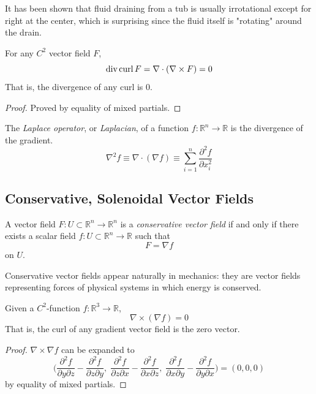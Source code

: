   It has been shown that fluid draining from a tub is usually irrotational except for right at the center, which is surprising since the fluid itself is "rotating" around the drain. 

  \begin{theorem}
  For any $C^2$ vector field $F$, 
  \[\operatorname{div}{\operatorname{curl}{F}} = \nabla\cdot (\nabla \times F) = 0\]
  That is, the divergence of any curl is 0. 
  \end{theorem}
  \begin{proof}
  Proved by equality of mixed partials. 
  \end{proof}

  \begin{definition}
  The \textit{Laplace operator}, or \textit{Laplacian}, of a function $f: \mathbb{R}^n \longrightarrow \mathbb{R}$ is the divergence of the gradient. 
  \[\nabla^2 f \equiv \nabla \cdot (\nabla f) \equiv \sum_{i=1}^n \frac{\partial^2 f}{\partial x_i^2}\]
  \end{definition}

\subsection{Conservative, Solenoidal Vector Fields}

  \begin{definition}
  A vector field $F: U \subset \mathbb{R}^n \longrightarrow \mathbb{R}^n$ is a \textit{conservative vector field} if and only if there exists a scalar field $f: U \subset \mathbb{R}^n \longrightarrow \mathbb{R}$ such that 
  \[F = \nabla f\]
  on $U$. 
  \end{definition}

  Conservative vector fields appear naturally in mechanics: they are vector fields representing forces of physical systems in which energy is conserved. 

  \begin{theorem}
  Given a $C^2$-function $f: \mathbb{R}^3 \longrightarrow \mathbb{R}$,
  \[\nabla \times ( \nabla f) = 0\]
  That is, the curl of any gradient vector field is the zero vector. 
  \end{theorem}
  \begin{proof}
  $\nabla \times \nabla f$ can be expanded to
  \[\bigg( \frac{\partial^2 f}{\partial y \partial z} - \frac{\partial^2 f}{\partial z \partial y}, \; \frac{\partial^2 f}{\partial z \partial x} - \frac{\partial^2 f}{\partial x \partial z}, \; \frac{\partial^2 f}{\partial x \partial y} - \frac{\partial^2 f}{\partial y \partial x}\bigg) = (0, 0, 0)\]
  by equality of mixed partials. 
  \end{proof}

